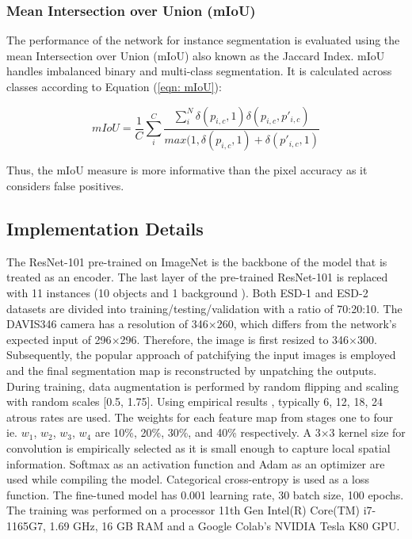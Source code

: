 \documentclass[lettersize,journal]{IEEEtran}
\begin{document}
\subsubsection{\textbf{Mean Intersection over Union (mIoU)}}

The performance of the network for instance segmentation is evaluated using the mean Intersection over Union (mIoU) also known as the Jaccard Index. mIoU handles imbalanced binary and multi-class segmentation. It is calculated across classes according to Equation (\ref{eqn: mIoU}):

\begin{equation}
    mIoU = \frac{1}{C}\sum_{i}^C \frac {\sum_{i}^N \delta (p_{i,c},1) \delta (p_{i,c},p'_{i,c})}{max (1,\delta (p_{i,c},1) + \delta (p'_{i,c},1) }
    \label{eqn: mIoU}
\end{equation}
 
Thus, the mIoU measure is more informative than the pixel accuracy as it considers false positives.




\subsection{\textbf{Implementation Details}}
\label{subsection : Implementation details}

The ResNet-101 pre-trained on ImageNet is the backbone of the model that is treated as an encoder. The last layer of the pre-trained ResNet-101 is replaced with 11 instances (10 objects and 1 background ). Both ESD-1 and ESD-2 datasets are divided into training/testing/validation with a ratio of 70:20:10. The DAVIS346 camera has a resolution of 346$\times$260, which differs from the network's expected input of 296$\times$296. Therefore, the image is first resized to 346$\times$300. Subsequently, the popular approach of patchifying the input images is employed and the final  segmentation map is reconstructed by unpatching the outputs. During training, data augmentation is performed by random flipping and scaling with random scales [0.5, 1.75]. Using empirical results \cite{Chen2018Encoder-DecoderSegmentation}, typically 6, 12, 18, 24 atrous rates are used. The weights for each feature map from stages one to four ie. $w_1$, $w_2$, $w_3$, $w_4$  are 10\%, 20\%, 30\%, and 40\% respectively. A 3$\times$3 kernel size for convolution is empirically selected as it is small enough to capture local spatial information. Softmax as an activation function and Adam as an optimizer are used while compiling the model. Categorical cross-entropy is used as a loss function. The fine-tuned model has 0.001 learning rate, 30 batch size, 100 epochs. The training was performed on a processor 11th Gen Intel(R) Core(TM) i7-1165G7, 1.69 GHz, 16 GB RAM and a Google Colab's NVIDIA Tesla K80 GPU. 
\end{document}
